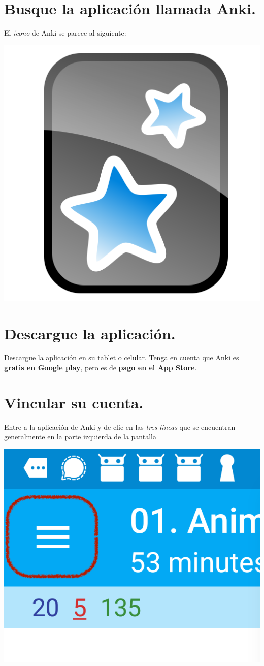 \documentclass[
]{book}
\begin{document}
\hypertarget{busque-la-aplicaciuxf3n-llamada-anki.}{%
\section{Busque la aplicación llamada Anki.}\label{busque-la-aplicaciuxf3n-llamada-anki.}}

El \emph{ícono} de Anki se parece al siguiente:

\includegraphics[width=0.5\linewidth]{images/reposit_sp/Anki_logo}

\hypertarget{descargue-la-aplicaciuxf3n.}{%
\section{Descargue la aplicación.}\label{descargue-la-aplicaciuxf3n.}}

Descargue la aplicación en su tablet o celular. Tenga en cuenta que Anki es \textbf{gratis en Google play}, pero es de \textbf{pago en el App Store}.

\hypertarget{vincular-su-cuenta.}{%
\section{Vincular su cuenta.}\label{vincular-su-cuenta.}}

Entre a la aplicación de Anki y de clic en las \emph{tres líneas} que se encuentran generalmente en la parte izquierda de la pantalla

\includegraphics[width=0.5\linewidth]{images/reposit_sp/tres_lineas}
\end{document}
